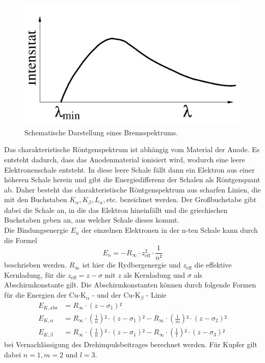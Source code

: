 \begin{figure}[H]
    \centering
    \includegraphics[width=\textwidth/2]{content/Bilder/Bremsspektrum.jpeg}
    \caption{Schematische Darstellung eines Bremsspektrums.\cite{anleitungV602}}
    \label{fig:Bremsspektrum}
\end{figure}

Das charakteristische Röntgenspektrum ist abhängig vom Material der Anode. Es entsteht dadurch, dass das Anodenmaterial ionisiert wird, wodurch eine leere 
Elektronenschale entsteht. In diese leere Schale fällt dann ein Elektron aus einer höheren Schale herein und gibt die Energiedifferenz der Schalen als Röntgenquant 
ab. Daher besteht das charakteristische Röntgenspektrum aus scharfen Linien, die mit den Buchstaben $K_\alpha, K_\beta, L_\alpha, \text{etc.}$ bezeichnet werden. Der
Großbuchstabe gibt dabei die Schale an, in die das Elektron hineinfällt und die griechischen Buchstaben geben an, aus welcher Schale dieses kommt. \\
Die Bindungsenergie $E_n$ der einzelnen Elektronen in der n-ten Schale kann durch die Formel 
\begin{equation}
E_n = - R_{\infty} \cdot z^{2}_{\text{eff}} \cdot \frac{1}{n²}
\label{Bindungsenergie_Elektronen}
\end{equation}
beschrieben werden. $R_{\infty}$ ist hier die Rydbergenergie und $z_{\text{eff}}$ die effektive Kernladung, für die $z_{\text{eff}} = z - \sigma$ mit $z$ als Kernladung 
und $\sigma$ als Abschirmkonstante gilt. 
Die Abschirmkonstanten können durch folgende Formen für die Energien der $\text{Cu-K}_\alpha$ - und der $\text{Cu-K}_{\beta}$ - Linie 
\begin{align}
    E_{K,\text{abs}} &= R_{\infty} \cdot \left(z - \sigma_1\right)² \label{eqn:Kupfer_Linien_Energien_abs} \\
    E_{K,\alpha} &= R_{\infty} \cdot \left(\frac{1}{n}\right)² \cdot \left(z - \sigma_1\right)² - R_{\infty} \cdot \left(\frac{1}{m}\right)² \cdot \left(z - \sigma_2\right)² \label{eqn:Kupfer_Linien_Energien_alpha}\\
    E_{K,\beta} &= R_{\infty} \cdot \left(\frac{1}{n}\right)² \cdot \left(z - \sigma_1\right)² - R_{\infty} \cdot \left(\frac{1}{l}\right)² \cdot \left(z - \sigma_3\right)² \label{eqn:Kupfer_Linien_Energien_beta}
 \end{align}
bei Vernachlässigung des Drehimpulsbeitrages berechnet werden. Für Kupfer gilt dabei $n = 1, m = 2$ und $l = 3$. \\



